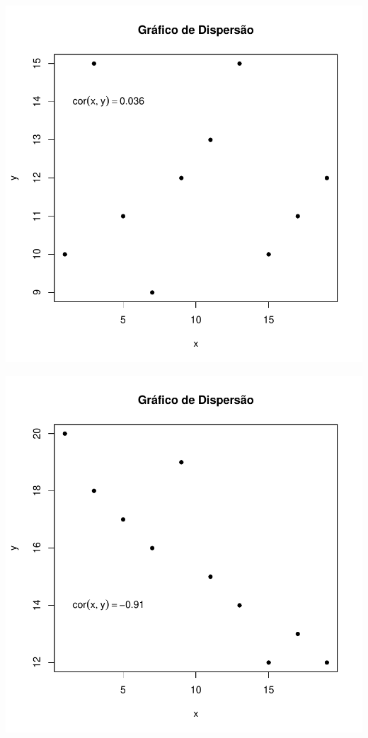 \documentclass[14pt,aspectratio=1610]{beamer}
\begin{document}
\begin{frame}[fragile]{}
\begin{center}
\includegraphics{Aula3-004}
\end{center}
\end{frame}

\begin{frame}[fragile]{}
\begin{center}
\includegraphics{Aula3-005}
\end{center}
\end{frame}
\end{document}
